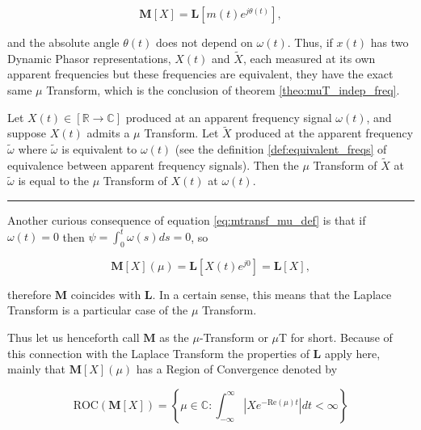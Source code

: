 \begin{equation} \mathbf{M}\left[X\right] = \mathbf{L} \left[m(t)e^{j\theta(t)}\right], \label{eq:mutransf_from_time}\end{equation}

	\noindent and the absolute angle $\theta(t)$ does not depend on $\omega(t)$. Thus, if $x(t)$ has two Dynamic Phasor representations, $X(t)$ and $\tilde{X}$, each measured at its own apparent frequencies but these frequencies are equivalent, they have the exact same $\mu$ Transform, which is the conclusion of theorem \ref{theo:muT_indep_freq}.

\begin{theorem}\label{theo:muT_indep_freq} Let $X(t)\in\left[\mathbb{R}\to\mathbb{C}\right]$ produced at an apparent frequency signal $\omega(t)$, and suppose $X(t)$ admits a $\mu$ Transform. Let $\tilde{X}$ produced at the apparent frequency $\tilde{\omega}$ where $\tilde{\omega}$ is equivalent to $\omega(t)$ (see the definition \ref{def:equivalent_freqs} of equivalence between apparent frequency signals). Then the $\mu$ Transform of $\tilde{X}$ at $\tilde{\omega}$ is equal to the $\mu$ Transform of $X(t)$ at $\omega(t)$.
\end{theorem}\vspace{3mm}\hrule\vspace{3mm}

	Another curious consequence of equation \eqref{eq:mtransf_mu_def} is that if $\omega(t) = 0$ then $\psi = \int_0^t \omega(s)ds = 0$, so

\begin{equation} \mathbf{M}\left[X\right]\left(\mu\right) = \mathbf{L}\left[X(t) e^{j0}\right] = \mathbf{L}\left[X\right], \end{equation}

	\noindent therefore $\mathbf{M}$ coincides with $\mathbf{L}$. In a certain sense, this means that the Laplace Transform is a particular case of the $\mu$ Transform.

	Thus let us  henceforth call $\mathbf{M}$ as the $\mu$-Transform or $\mu$T for short. Because of this connection with the Laplace Transform the properties of $\mathbf{L}$ apply here, mainly that $\mathbf{M}\left[X\right]\left(\mu\right)$ has a Region of Convergence denoted by

\begin{equation}\text{ROC}\left(\mathbf{M}\left[X\right]\right) = \left\{\mu\in\mathbb{C}: \int_{-\infty}^{\infty} \left\lvert X e^{-\text{Re}\left(\mu\right) t}\right\rvert dt < \infty \right\} \end{equation}

